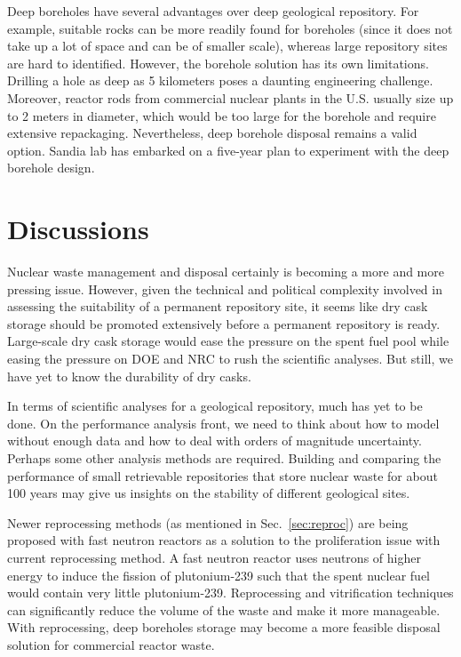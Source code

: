 \documentclass[nofootinbib,preprint,aip,pra]{revtex4-1}
\begin{document}
        Deep boreholes have several advantages over deep geological repository. For example, suitable
        rocks can be more readily found for boreholes (since it does not take up a lot of space and can be
        of smaller scale),
        whereas large repository sites are hard to identified. \cite{b09,c15}
        However, the borehole solution has its own limitations.
        Drilling a hole as deep as 5 kilometers poses a daunting engineering challenge.
        Moreover, reactor rods from commercial nuclear plants in the U.S. usually size up to 2 meters in diameter,
        which would be too large for the borehole and require extensive repackaging.
        Nevertheless, deep borehole disposal remains a valid option.
        Sandia lab has embarked on a five-year plan to experiment with the deep borehole design.\cite{c15}


\section{Discussions}
Nuclear waste management and disposal certainly is becoming a more and more pressing issue.
However, given the technical and political complexity involved in assessing the suitability
of a permanent repository site,\cite{me06} it seems like dry cask storage should be promoted extensively
before a permanent repository is ready. Large-scale dry cask storage would ease the pressure on the
spent fuel pool while easing the pressure on DOE and NRC to rush the scientific analyses.
But still, we have yet to know the durability of dry casks.

In terms of scientific analyses for a geological repository, much has yet to be done.
On the performance analysis front, we need
to think about how to model without enough data and how to deal with orders of magnitude uncertainty.
Perhaps some other analysis methods are required. Building and comparing the performance of 
small retrievable repositories that store
nuclear waste for about 100 years may give us insights on the stability of different geological sites.

Newer reprocessing methods (as mentioned in Sec.~\ref{sec:reproc}) are being proposed with
fast neutron reactors as a solution to the proliferation issue with current reprocessing method.
A fast neutron reactor uses neutrons of higher energy to induce the fission of plutonium-239
such that the spent nuclear fuel would contain very little plutonium-239. Reprocessing and
vitrification techniques can significantly reduce the volume of the waste and make it more
manageable. With reprocessing, deep boreholes storage may become a more feasible disposal solution 
for commercial reactor waste.

\newpage


\end{document}
